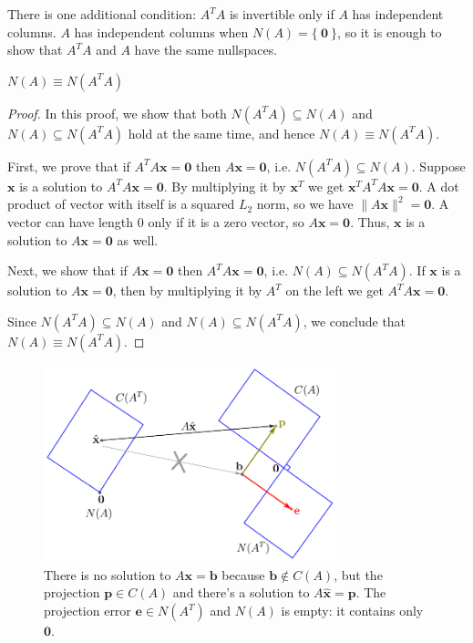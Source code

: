\documentclass{acm_proc_article-sp}
\begin{document}
There is one additional condition: \(A^T A\) is invertible only if \(A\) has
independent columns. \(A\) has independent columns when \(N(A) = \{ \ \mathbf 0 \ \}\),
so it is enough to show that \(A^T A\) and \(A\) have the same nullspaces.

\begin{prop}\(N(A) \equiv N(A^T A)\)\end{prop}

\begin{proof}In this proof, we show that both \(N(A^T A) \subseteq N(A)\) and \(N(A) \subseteq N(A^T A)\) hold at the same time, and hence \(N(A) \equiv N(A^T A)\).

First, we prove that if \(A^T A \mathbf x = \mathbf 0\) then \(A \mathbf x = \mathbf 0\),
i.e. \(N(A^T A) \subseteq N(A)\). Suppose \(\mathbf x\) is a solution to
\(A^T A \mathbf x = \mathbf 0\). By multiplying it by \(\mathbf x^T\) we get
\(\mathbf x^T A^T A \mathbf x = \mathbf 0\). A dot product of vector with itself is a squared
$L_2$ norm, so we have \(\|A \mathbf x \|^2 = \mathbf 0\). A vector can have length $0$ only if
it is a zero vector, so \(A \mathbf x = \mathbf 0\). Thus, $\mathbf x$ is a solution to
\(A \mathbf x = \mathbf 0\) as well.

Next, we show that if \(A \mathbf x = \mathbf 0\) then
\(A^T A \mathbf x = \mathbf 0\), i.e. \(N(A) \subseteq N(A^T A)\).
If \(\mathbf x\) is a solution to \(A \mathbf x = \mathbf 0\), then by multiplying it by
\(A^T\) on the left we get \(A^T A \mathbf x = \mathbf 0\).

Since \(N(A^T A) \subseteq N(A)\) and \(N(A) \subseteq N(A^T A)\),
we conclude that \(N(A) \equiv N(A^T A)\).\end{proof}


\begin{figure}%
\centering
\includegraphics[width=8.5cm]{diagram2-least-squares.pdf}
\caption{There is no solution to $A \mathbf x = \mathbf b$ because $\mathbf b \not \in C(A)$, but the projection $\mathbf p \in C(A)$ and there's a solution to $A \hat {\mathbf x} = \mathbf p$. The projection error $\mathbf e \in N(A^T)$ and $N(A)$ is empty: it contains only $\mathbf 0$.}
\label{lab:diagram2-least-squares}
\end{figure}
\end{document}
